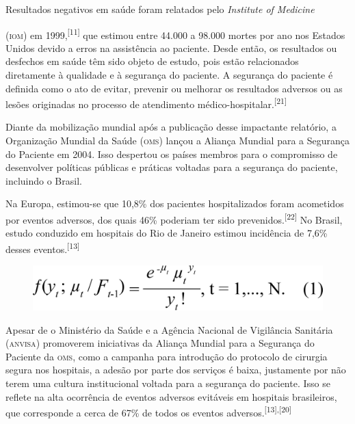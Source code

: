 \documentclass{article}
\newcounter{fn1}
\newcounter{fn2}
\newcounter{fn3}
\newcounter{fn4}
\newcounter{fn5}
\newcounter{fn6}
\newcounter{fn7}
\newcounter{fn8}
\begin{document}
Resultados negativos em saúde foram relatados pelo \textit{Institute of
Medicine}

(\textsc{iom}) em 1999,\textsuperscript{[}\textsuperscript{11}\textsuperscript{]}
que estimou entre 44.000 a 98.000 mortes por ano nos Estados Unidos devido a
erros
na assistência ao paciente. Desde então, os resultados ou desfechos em saúde têm
sido objeto
de estudo, pois estão relacionados diretamente à qualidade e à segurança do
paciente. A
segurança do paciente é definida como o ato de evitar, prevenir ou melhorar os
resultados
adversos ou as lesões originadas no processo de atendimento médico-hospitalar.\textsuperscript{[}\textsuperscript{21}\textsuperscript{]}

Diante da mobilização mundial após a publicação desse impactante relatório, a
Organização
Mundial da Saúde (\textsc{oms}) lançou a Aliança Mundial para a Segurança do Paciente em
2004.
Isso despertou os países membros para o compromisso de desenvolver políticas
públicas e práticas voltadas para a segurança do paciente, incluindo o Brasil.

Na Europa, estimou-se que 10,8\% dos pacientes hospitalizados foram acometidos
por eventos
adversos, dos quais 46\% poderiam ter sido prevenidos.\textsuperscript{[}\textsuperscript{22}\textsuperscript{]}
No Brasil, estudo conduzido em hospitais do Rio de Janeiro estimou incidência de
7,6\% desses eventos.\textsuperscript{[}\textsuperscript{13}\textsuperscript{]}

\begin{center}
\begin{figure}[h]
\includegraphics[width=.5\textwidth]{0034-8910-rsp-48-3-0451-ee01.jpg}
\end{figure}
\end{center}

Apesar de o Ministério da Saúde e a Agência Nacional de Vigilância Sanitária
(\textsc{anvisa})
promoverem iniciativas da Aliança Mundial para a Segurança do Paciente da \textsc{oms},
como a
campanha para introdução do protocolo de cirurgia segura nos hospitais, a adesão
por parte
dos serviços é baixa, justamente por não terem uma cultura institucional voltada
para a
segurança do paciente. Isso se reflete na alta ocorrência de eventos adversos
evitáveis em
hospitais brasileiros, que corresponde a cerca de 67\% de todos os eventos
adversos.\textsuperscript{[}\textsuperscript{13}\textsuperscript{]}\textsuperscript{,}\textsuperscript{[}\textsuperscript{20}\textsuperscript{]}
\end{document}
